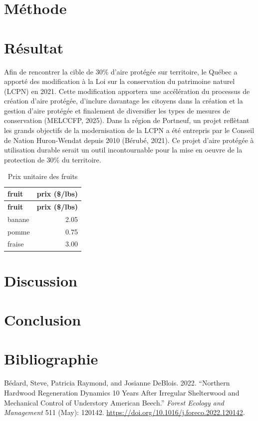 \documentclass[
  12pt,
]{article}
\newlength{\cslhangindent}
\newenvironment{CSLReferences}[2] %
 {\begin{list}{}{%
  \setlength{\itemindent}{0pt}
  \setlength{\leftmargin}{0pt}
  \setlength{\parsep}{0pt}
  \ifodd #1
   \setlength{\leftmargin}{\cslhangindent}
   \setlength{\itemindent}{-1\cslhangindent}
  \fi
  \setlength{\itemsep}{#2\baselineskip}}}
 {\end{list}}
\begin{document}
\section{Méthode}\label{muxe9thode}

\section{Résultat}\label{ruxe9sultat}

Afin de rencontrer la cible de 30\% d'aire protégée sur territoire, le
Québec a apporté des modification à la Loi sur la conservation du
patrimoine naturel (LCPN) en 2021. Cette modification apportera une
accélération du processus de création d'aire protégée, d'inclure
davantage les citoyens dans la création et la gestion d'aire protégée et
finalement de diversifier les types de mesures de conservation (MELCCFP,
2025). Dans la région de Portneuf, un projet reflètant les grands
objectifs de la modernisation de la LCPN a été entrepris par le Conseil
de Nation Huron-Wendat depuis 2010 (Bérubé, 2021). Ce projet d'aire
protégée à utilisation durable serait un outil incontournable pour la
mise en oeuvre de la protection de 30\% du territoire.

\begin{longtable}[]{@{}lr@{}}
\caption{Prix unitaire des fruits}\tabularnewline
\toprule\noalign{}
\textbf{fruit} & \textbf{prix (\$/lbs)} \\
\midrule\noalign{}
\endfirsthead
\toprule\noalign{}
\textbf{fruit} & \textbf{prix (\$/lbs)} \\
\midrule\noalign{}
\endhead
\bottomrule\noalign{}
\endlastfoot
banane & 2.05 \\
pomme & 0.75 \\
fraise & 3.00 \\
\end{longtable}

\section{Discussion}\label{discussion}

\section{Conclusion}\label{conclusion}

\newpage{}

\section{Bibliographie}\label{bibliographie}

\hfill\break

\label{refs}
\begin{CSLReferences}{1}{0}
Bédard, Steve, Patricia Raymond, and Josianne DeBlois. 2022. {``Northern
Hardwood Regeneration Dynamics 10 Years After Irregular Shelterwood and
Mechanical Control of Understory American Beech.''} \emph{Forest Ecology
and Management} 511 (May): 120142.
\url{https://doi.org/10.1016/j.foreco.2022.120142}.

\end{CSLReferences}
\end{document}
